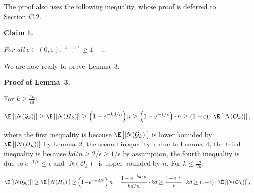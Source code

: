 


The proof also uses the following inequality, whose proof is deferred to Section C.2.\par





\par\medskip\noindent\textbf{\textbf{Claim 1}\textbf{.}}\par



\emph{For all $\epsilon\in(0,1)$, $\frac{1-e^{-\epsilon}}{\epsilon}\geq 1-\epsilon$.}\par






We are now ready to prove Lemma 3.\par




\par\medskip\noindent\textbf{Proof of Lemma 3.}\par



For $k\geq\frac{2n}{\epsilon d}$:\par


\[\begin{gathered}
\displaystyle\E\left[|N(\mathcal{G}_{k})|\right]\geq\E\left[|N(H_{k})|\right]\geq\left(1-e^{-kd/n}\right)n\geq\left(1-e^{-1/\epsilon}\right)\cdot n\geq\left(1-\epsilon\right)\cdot\E\left[|N(\mathcal{O}_{k})|\right],
\end{gathered}\]


where the first inequality is because $\E\left[|N(\mathcal{G}_{k})|\right]$ is lower bounded by $\E\left[|N(H_{k})|\right]$ by Lemma 2, the second inequality is due to Lemma 4, the third inequality is because $kd/n\geq 2/\epsilon\geq 1/\epsilon$ by assumption, the fourth inequality is due to $e^{-1/\epsilon}\leq\epsilon$ and $|N(\mathcal{O}_{k})|$ is upper bounded by $n$. For $k\leq\frac{\epsilon n}{2d}$:\par


\[\begin{gathered}
\displaystyle\E\left[|N(\mathcal{G}_{k})|\right]\geq\E\left[|N(H_{k})|\right]\geq\left(1\!-\!e^{-kd/n}\right)n=\frac{1-e^{-kd/n}}{kd/n}\cdot kd\geq\frac{1\!-\!e^{-\epsilon}}{\epsilon}\cdot kd\geq\left(1\!-\!\epsilon\right)\cdot\E\left[|N(\mathcal{O}_{k})|\right],
\end{gathered}\]


